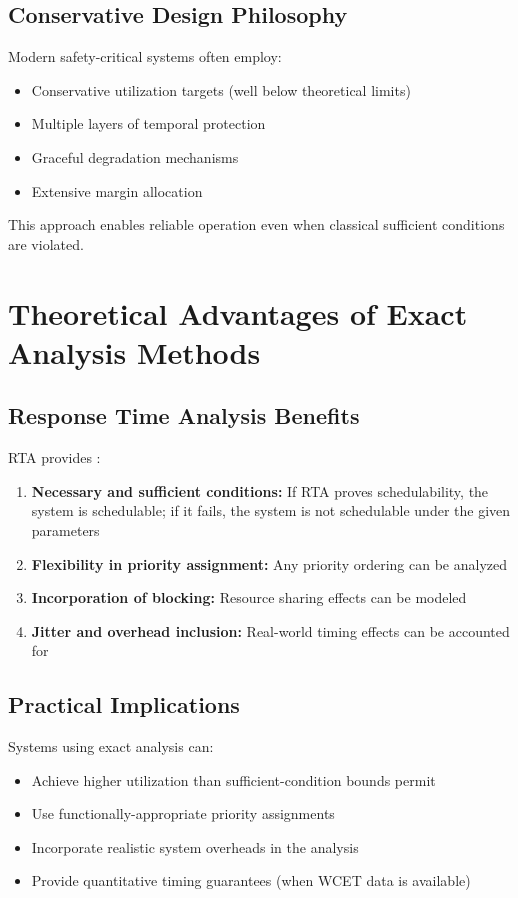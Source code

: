\documentclass[12pt,a4paper]{article}
\begin{document}
\subsection{Conservative Design Philosophy}

Modern safety-critical systems often employ:
\begin{itemize}
\item Conservative utilization targets (well below theoretical limits)
\item Multiple layers of temporal protection
\item Graceful degradation mechanisms
\item Extensive margin allocation
\end{itemize}

This approach enables reliable operation even when classical sufficient conditions are violated.

\section{Theoretical Advantages of Exact Analysis Methods}

\subsection{Response Time Analysis Benefits}

RTA provides \cite{audsley1993}:
\begin{enumerate}
\item \textbf{Necessary and sufficient conditions:} If RTA proves schedulability, the system is schedulable; if it fails, the system is not schedulable under the given parameters
\item \textbf{Flexibility in priority assignment:} Any priority ordering can be analyzed
\item \textbf{Incorporation of blocking:} Resource sharing effects can be modeled
\item \textbf{Jitter and overhead inclusion:} Real-world timing effects can be accounted for
\end{enumerate}

\subsection{Practical Implications}

Systems using exact analysis can:
\begin{itemize}
\item Achieve higher utilization than sufficient-condition bounds permit
\item Use functionally-appropriate priority assignments
\item Incorporate realistic system overheads in the analysis
\item Provide quantitative timing guarantees (when WCET data is available)
\end{itemize}
\end{document}
